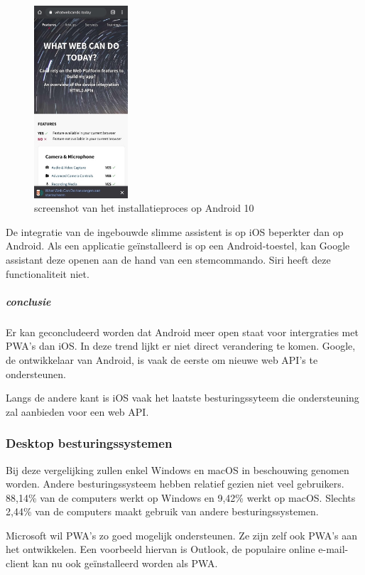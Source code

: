 		\begin{figure}[H]
			\centering
			\includegraphics[width=35mm]{./img/installation_android.png}
			\caption{screenshot van het installatieproces op Android 10}
			\label{A2HSExperienceIOS}
		\end{figure}
	
	
		De integratie van de ingebouwde slimme assistent is op iOS beperkter dan op Android. Als een applicatie geïnstalleerd is op een Android-toestel, kan Google assistant deze openen aan de hand van een stemcommando. Siri heeft deze functionaliteit niet.
		\autocite{Lathiya2020}
		
		\newpage
		\subparagraph{conclusie}
		
			Er kan geconcludeerd worden dat Android meer open staat voor intergraties met PWA's dan iOS. In deze trend lijkt er niet direct verandering te komen. Google, de ontwikkelaar van Android, is vaak de eerste om nieuwe web API's te ondersteunen.
			
			Langs de andere kant is iOS vaak het laatste besturingssyteem die ondersteuning zal aanbieden voor een web API.
	
	
	\subsubsection{Desktop besturingssystemen}
		Bij deze vergelijking zullen enkel Windows en macOS in beschouwing genomen worden. Andere besturingssysteem hebben relatief gezien niet veel gebruikers. 88,14\% van de computers werkt op Windows en 9,42\% werkt op macOS. Slechts 2,44\% van de computers maakt gebruik van andere besturingssystemen.
		\autocite{netMarketShare2020}
		
		Microsoft wil PWA's zo goed mogelijk ondersteunen. Ze zijn zelf ook PWA's aan het ontwikkelen. Een voorbeeld hiervan is Outlook, de populaire online e-mail-client kan nu ook geïnstalleerd worden als PWA.
		\autocite{Microsoft2020a}
		
